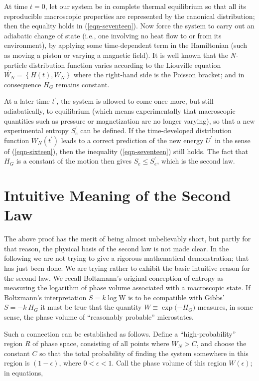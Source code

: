 \documentclass[twocolumn]{article}
\begin{document}
At time \(t = 0\), let our system be in complete thermal equilibrium so
that all its reproducible macroscopic properties are represented by the
canonical distribution; then the equality holds in (\ref{eqn-seventeen}). Now force the
system to carry out an adiabatic change of state (i.e., one involving no
heat flow to or from its environment), by applying some time-dependent
term in the Hamiltonian (such as moving a piston or varying a magnetic
field). It is well known that the \emph{N-}particle distribution
function varies according to the Liouville equation
~\(\dot{W_{N}} = \left\{ H\left( t \right),W_{N} \right\}\) where the
right-hand side is the Poisson bracket; and in consequence \(H_{G}\)
remains constant.

At a later time \(t^{\prime}\)\emph{,} the system is allowed to come once
more, but still adiabatically, to equilibrium (which means
experimentally that macroscopic quantities such as pressure or
magnetization are no longer varying), so that a new experimental entropy
\(S_{e}^{\prime}\) can be defined. If the time-developed distribution
function \(W_{N}(t^{\prime})\) leads to a correct prediction of the new
energy \(U^{\prime}\) in the sense of (\ref{eqn-sixteen}), then the inequality (\ref{eqn-seventeen}) still
holds. The fact that \(H_{G}\) is a constant of the motion then gives
\(S_{e} \leq S_{e}^{\prime}\), which is the second law.

\section{Intuitive Meaning of the Second Law}\label{sec-intiutive-meaning-of-the-second-law}

The above proof has the merit of being almost unbelievably short, but
partly for that reason, the physical basis of the second law is not made
clear. In the following we are not trying to give a rigorous
mathematical demonstration; that has just been done. We are trying
rather to exhibit the basic intuitive reason for the second law. We
recall Boltzmann's original conception of entropy as measuring the
logarithm of phase volume associated with a macroscopic state. If
Boltzmann's interpretation \(S = k\log\text{W\ }\)is to be compatible
with Gibbs' \(S = - k\ H_{G}\) it must be true that the quantity
\(W \equiv \exp{( - H_{G}})\) measures, in some sense, the phase volume
of ``reasonably probable'' microstates.

Such a connection can be established as follows. Define a
``high-probability'' region \(R\) of phase space, consisting of all
points where \(W_{N} > C\), and choose the constant \(C\) so that the
total probability of finding the system somewhere in this region is
\((1 - \epsilon)\), where \(0 < \epsilon < 1\). Call the phase volume of
this region \(W(\epsilon)\); in equations,
\end{document}
